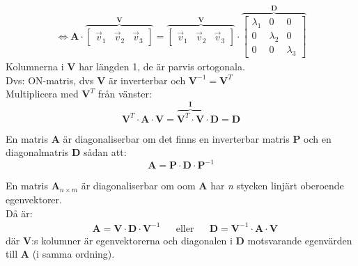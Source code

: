 \begin{Ex}
\begin{gather*}
	\Leftrightarrow
	\mathbf{A} \cdot 
	\overbrace{\begin{bmatrix}
		\vec{v}_1 & \vec{v}_2 & \vec{v}_3
	\end{bmatrix}}^{\mathbf{V}}
	= 
	\overbrace{\begin{bmatrix}
		\vec{v}_1 & \vec{v}_2 & \vec{v}_3
	\end{bmatrix}}^{\mathbf{V}}
	\cdot
	\overbrace{\begin{bmatrix}
		\lambda_1 & 0 & 0\\
		0 & \lambda_2 & 0\\
		0 & 0 & \lambda_3
	\end{bmatrix}}^{\mathbf{D}}
	\end{gather*}
	Kolumnerna i \textbf{V} har längden 1, de är parvis ortogonala.\\
	Dvs: ON-matris, dvs \textbf{V} är inverterbar och $\mathbf{V}^{-1} = \mathbf{V}^T$\\
	Multiplicera med $\mathbf{V}^T$ från vänster:
	\[
	\mathbf{V}^T \cdot \mathbf{A} \cdot \mathbf{V} = \overbrace{\mathbf{V}^T \cdot \mathbf{V}}^{\mathbf{I}} \cdot \mathbf{D} = \mathbf{D}
	\]
\end{Ex}
\begin{Def}
	En matris \textbf{A} är diagonaliserbar om det finns en inverterbar matris \textbf{P} och en diagonalmatris \textbf{D} sådan att:
	\[
	\mathbf{A} = \mathbf{P} \cdot \mathbf{D} \cdot \mathbf{P}^{-1}
	\]
\end{Def}
\begin{sats}
	En matris $\mathbf{A}_{n \times m}$ är diagonaliserbar om oom \textbf{A} har \textit{n} stycken linjärt oberoende egenvektorer.\\
	Då är:
	\begin{align*}
	&\mathbf{A} = \mathbf{V} \cdot \mathbf{D} \cdot \mathbf{V}^{-1}
	&&\mbox{eller}
	&&\mathbf{D} = \mathbf{V}^{-1} \cdot \mathbf{A} \cdot \mathbf{V}
	\end{align*}
	där \textbf{V}:s kolumner är egenvektorerna och diagonalen i \textbf{D} motsvarande egenvärden till \textbf{A} (i samma ordning).
\end{sats}

